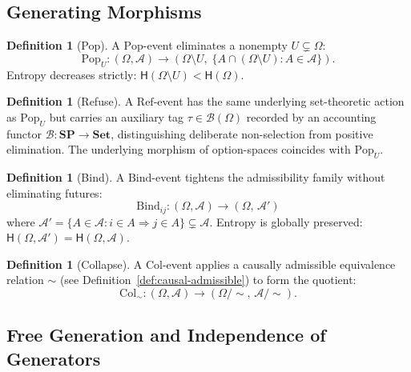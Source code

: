 \documentclass[12pt,a4paper]{article}
\theoremstyle{definition}
\newtheorem{definition}[theorem]{Definition}
\theoremstyle{remark}
\newcommand{\Ent}{\mathsf{H}}
\newcommand{\SP}{\mathbf{SP}}
\newcommand{\Pop}{\mathrm{Pop}}
\newcommand{\Ref}{\mathrm{Ref}}
\newcommand{\Bind}{\mathrm{Bind}}
\newcommand{\Col}{\mathrm{Col}}
\begin{document}
\subsection{Generating Morphisms}

\begin{definition}[Pop]
\label{def:pop}
A $\Pop$-event eliminates a nonempty $U\subsetneq\Omega$:
\[
  \Pop_U : (\Omega,\mathcal{A}) \longrightarrow
  (\Omega\setminus U,\;\{A\cap(\Omega\setminus U):A\in\mathcal{A}\}).
\]
Entropy decreases strictly: $\Ent(\Omega\setminus U)<\Ent(\Omega)$.
\end{definition}

\begin{definition}[Refuse]
\label{def:ref}
A $\Ref$-event has the same underlying set-theoretic action as $\Pop_U$ but carries
an auxiliary tag $\tau\in\mathcal{B}(\Omega)$ recorded by an accounting functor
$\mathcal{B}:\SP\to\mathbf{Set}$, distinguishing deliberate non-selection from
positive elimination. The underlying morphism of option-spaces coincides with $\Pop_U$.
\end{definition}

\begin{definition}[Bind]
\label{def:bind}
A $\Bind$-event tightens the admissibility family without eliminating futures:
\[
  \Bind_{ij} : (\Omega,\mathcal{A}) \longrightarrow
  (\Omega,\,\mathcal{A}')
\]
where $\mathcal{A}'=\{A\in\mathcal{A}: i\in A\Rightarrow j\in A\}\subsetneq\mathcal{A}$.
Entropy is globally preserved: $\Ent(\Omega,\mathcal{A}')=\Ent(\Omega,\mathcal{A})$.
\end{definition}

\begin{definition}[Collapse]
\label{def:col}
A $\Col$-event applies a causally admissible equivalence relation $\sim$ (see
Definition~\ref{def:causal-admissible}) to form the quotient:
\[
  \Col_\sim : (\Omega,\mathcal{A}) \longrightarrow
  (\Omega/{\sim},\,\mathcal{A}/{\sim}).
\]
\end{definition}

\subsection{Free Generation and Independence of Generators}
\end{document}
